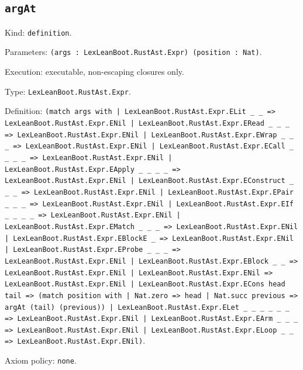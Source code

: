 \documentclass[11pt]{article}
\begin{document}
\subsection*{\texttt{argAt}}
\noindent Kind: \texttt{definition}.\par
\noindent Parameters: \texttt{(args : LexLeanBoot.RustAst.Expr) (position : Nat)}.\par
\noindent Execution: executable, non-escaping closures only.\par
\noindent Type: \texttt{LexLeanBoot.RustAst.Expr}.\par
\noindent Definition: \texttt{(match args with | LexLeanBoot.RustAst.Expr.ELit \_ \_ => LexLeanBoot.RustAst.Expr.ENil | LexLeanBoot.RustAst.Expr.ERead \_ \_ \_ => LexLeanBoot.RustAst.Expr.ENil | LexLeanBoot.RustAst.Expr.EWrap \_ \_ \_ => LexLeanBoot.RustAst.Expr.ENil | LexLeanBoot.RustAst.Expr.ECall \_ \_ \_ \_ => LexLeanBoot.RustAst.Expr.ENil | LexLeanBoot.RustAst.Expr.EApply \_ \_ \_ \_ => LexLeanBoot.RustAst.Expr.ENil | LexLeanBoot.RustAst.Expr.EConstruct \_ \_ \_ => LexLeanBoot.RustAst.Expr.ENil | LexLeanBoot.RustAst.Expr.EPair \_ \_ \_ => LexLeanBoot.RustAst.Expr.ENil | LexLeanBoot.RustAst.Expr.EIf \_ \_ \_ \_ => LexLeanBoot.RustAst.Expr.ENil | LexLeanBoot.RustAst.Expr.EMatch \_ \_ \_ => LexLeanBoot.RustAst.Expr.ENil | LexLeanBoot.RustAst.Expr.EBlockE \_ => LexLeanBoot.RustAst.Expr.ENil | LexLeanBoot.RustAst.Expr.EProbe \_ \_ \_ => LexLeanBoot.RustAst.Expr.ENil | LexLeanBoot.RustAst.Expr.EBlock \_ \_ => LexLeanBoot.RustAst.Expr.ENil | LexLeanBoot.RustAst.Expr.ENil => LexLeanBoot.RustAst.Expr.ENil | LexLeanBoot.RustAst.Expr.ECons head tail => (match position with | Nat.zero => head | Nat.succ previous => argAt (tail) (previous)) | LexLeanBoot.RustAst.Expr.ELet \_ \_ \_ \_ \_ \_ => LexLeanBoot.RustAst.Expr.ENil | LexLeanBoot.RustAst.Expr.EArm \_ \_ \_ => LexLeanBoot.RustAst.Expr.ENil | LexLeanBoot.RustAst.Expr.ELoop \_ \_ => LexLeanBoot.RustAst.Expr.ENil)}.\par
\noindent Axiom policy: \texttt{none}.\par
\end{document}
